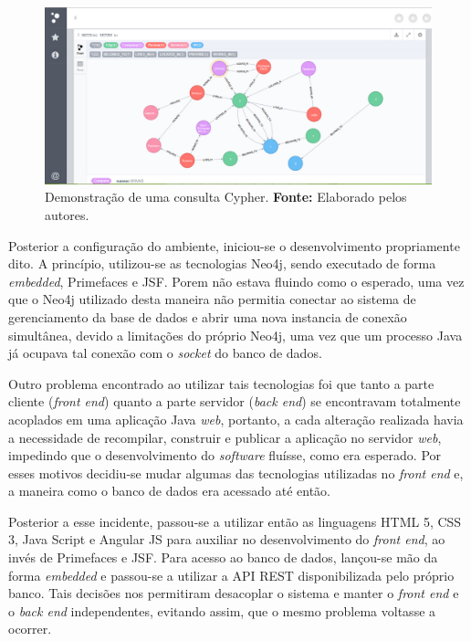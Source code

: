 \begin{figure}[h!]
	\centerline{\includegraphics[scale=0.4]{./imagens/neo4j2.jpg}}
	\caption[Demonstração de uma consulta Cypher.]
	{Demonstração de uma consulta Cypher. \textbf{Fonte:} Elaborado pelos autores.}
	\label{fig:exemplo1}
\end{figure}
 
\newpage

\par Posterior a configuração do ambiente, iniciou-se o desenvolvimento propriamente dito. A princípio, utilizou-se as tecnologias Neo4j, sendo executado de forma \textit{embedded}, Primefaces e JSF. Porem não estava fluindo como o esperado, uma vez que o Neo4j utilizado desta maneira não permitia conectar ao sistema de gerenciamento da base de dados e abrir uma nova instancia de conexão simultânea, devido a limitações do próprio Neo4j, uma vez que um processo Java já ocupava tal conexão com o \textit{socket} do banco de dados.

\par Outro problema encontrado ao utilizar tais tecnologias foi que tanto a parte cliente (\textit{front end}) quanto a parte servidor (\textit{back end}) se encontravam totalmente acoplados em uma aplicação Java \textit{web}, portanto, a cada alteração realizada havia a necessidade de recompilar, construir e publicar a aplicação no servidor \textit{web}, impedindo que o desenvolvimento do \textit{software} fluísse, como era esperado. Por esses motivos decidiu-se mudar algumas das tecnologias utilizadas no \textit{front end} e, a maneira como o banco de dados era acessado até então. 

\par Posterior a esse incidente, passou-se a utilizar então as linguagens HTML 5, CSS 3, Java Script e Angular JS para auxiliar no desenvolvimento do \textit{front end}, ao invés de Primefaces e JSF. Para acesso ao banco de dados, lançou-se mão da forma \textit{embedded} e passou-se a utilizar a API REST disponibilizada pelo próprio banco. Tais decisões nos permitiram desacoplar o sistema e manter o \textit{front end} e o \textit{back end} independentes, evitando assim, que o mesmo problema voltasse a ocorrer.

